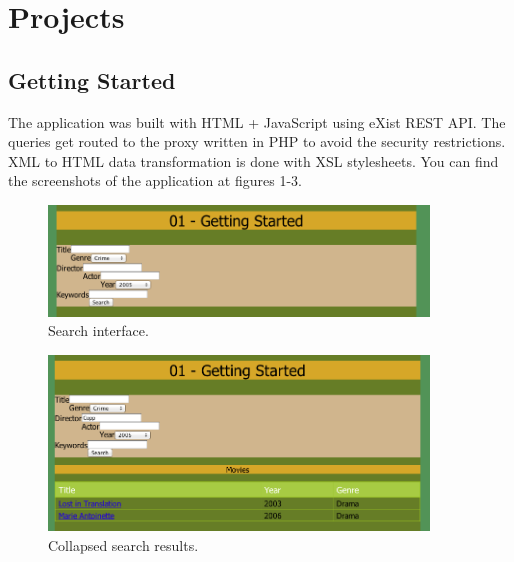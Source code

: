\documentclass[a4paper, notitlepage]{article}
\begin{document}
\section{Projects}

\subsection{Getting Started}

The application was built with HTML + JavaScript using eXist REST API. The queries get routed to the proxy written in PHP to avoid the security restrictions. XML to HTML data transformation is done with XSL stylesheets. You can find the screenshots of the application at figures 1-3.

\begin{figure}[ht]
\begin{center}
\includegraphics[width=0.9\textwidth]{01-1.png}
\caption{Search interface.}
\label{fig:01-1}
\end{center}
\end{figure}

\begin{figure}[ht]
\begin{center}
\includegraphics[width=0.9\textwidth]{01-2.png}
\caption{Collapsed search results.}
\label{fig:01-2}
\end{center}
\end{figure}
\end{document}
